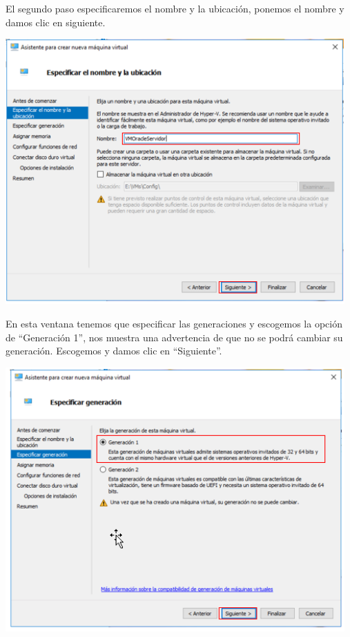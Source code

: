 El segundo paso especificaremos el nombre y la ubicación, ponemos el nombre y damos clic en siguiente. 
	\begin{center}
		\includegraphics[width=13cm]{./Imagenes/16} 
	\end{center} 

\vspace{\baselineskip}

En esta ventana tenemos que especificar las generaciones y escogemos la opción de “Generación 1”, nos muestra una advertencia de que no se podrá cambiar su generación.  Escogemos y damos clic en “Siguiente”. 
	\begin{center}
		\includegraphics[width=13cm]{./Imagenes/17} 
	\end{center} 

